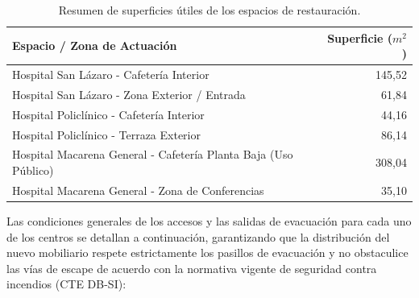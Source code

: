 \documentclass[12pt,a4paper]{article}
\begin{document}
\begin{table}[h]
\centering
\begin{tabular}{p{9cm}r}
\toprule
\textbf{Espacio / Zona de Actuación} & \textbf{Superficie ($m^2$)} \\
\midrule
Hospital San Lázaro - Cafetería Interior & 145,52 \\
Hospital San Lázaro - Zona Exterior / Entrada & 61,84 \\
Hospital Policlínico - Cafetería Interior & 44,16 \\
Hospital Policlínico - Terraza Exterior & 86,14 \\
Hospital Macarena General - Cafetería Planta Baja (Uso Público) & 308,04 \\
Hospital Macarena General - Zona de Conferencias & 35,10 \\
\bottomrule
\end{tabular}
\caption{Resumen de superficies útiles de los espacios de restauración.}
\label{tab:superficies}
\end{table}

Las condiciones generales de los accesos y las salidas de evacuación para cada uno de los centros se detallan a continuación, garantizando que la distribución del nuevo mobiliario respete estrictamente los pasillos de evacuación y no obstaculice las vías de escape de acuerdo con la normativa vigente de seguridad contra incendios (CTE DB-SI):
\end{document}
